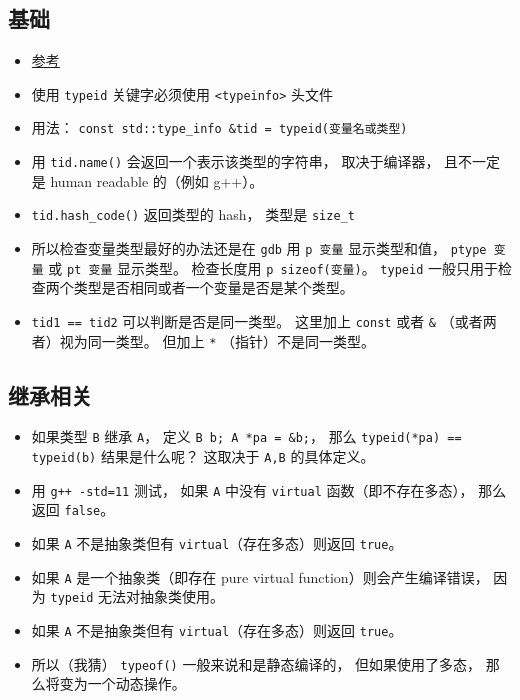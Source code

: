 
\begin{issues}
\issueDraft
\end{issues}

\subsection{基础}
\begin{itemize}
\item \href{https://en.cppreference.com/w/cpp/language/typeid}{参考}
\item 使用 \verb|typeid| 关键字必须使用 \verb|<typeinfo>| 头文件
\item 用法： \verb|const std::type_info &tid = typeid(变量名或类型)|
\item 用 \verb|tid.name()| 会返回一个表示该类型的字符串， 取决于编译器， 且不一定是 human readable 的（例如 g++）。
\item \verb|tid.hash_code()| 返回类型的 hash， 类型是 \verb|size_t|
\item 所以检查变量类型最好的办法还是在 \verb|gdb| 用 \verb|p 变量| 显示类型和值， \verb|ptype 变量| 或 \verb|pt 变量| 显示类型。 检查长度用 \verb|p sizeof(变量)|。 \verb|typeid| 一般只用于检查两个类型是否相同或者一个变量是否是某个类型。
\item \verb|tid1 == tid2| 可以判断是否是同一类型。 这里加上 \verb|const| 或者 \verb|&| （或者两者）视为同一类型。 但加上 \verb|*| （指针）不是同一类型。
\end{itemize}

\subsection{继承相关}
\begin{itemize}
\item 如果类型 \verb|B| 继承 \verb|A|， 定义 \verb|B b; A *pa = &b;|， 那么 \verb|typeid(*pa) == typeid(b)| 结果是什么呢？ 这取决于 \verb|A,B| 的具体定义。
\item 用 \verb|g++ -std=11| 测试， 如果 \verb|A| 中没有 \verb|virtual| 函数（即不存在多态）， 那么返回 \verb|false|。
\item 如果 \verb|A| 不是抽象类但有 \verb|virtual|（存在多态）则返回 \verb|true|。
\item 如果 \verb|A| 是一个抽象类（即存在 pure virtual function）则会产生编译错误， 因为 \verb|typeid| 无法对抽象类使用。
\item 如果 \verb|A| 不是抽象类但有 \verb|virtual|（存在多态）则返回 \verb|true|。
\item 所以（我猜） \verb|typeof()| 一般来说和是静态编译的， 但如果使用了多态， 那么将变为一个动态操作。
\end{itemize}
